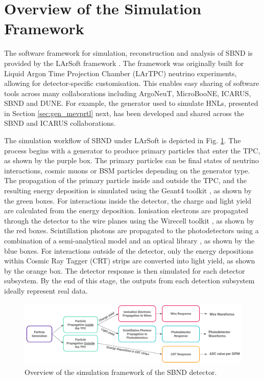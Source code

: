 \section{Overview of the Simulation Framework}
\label{sec:overview_sim}

The software framework for simulation, reconstruction and analysis of SBND is provided by the LArSoft framework \cite{larsoft}. 
The framework was originally built for Liquid Argon Time Projection Chamber (LArTPC) neutrino experiments, allowing for detector-specific customisation. 
This enables easy sharing of software tools across many collaborations including ArgoNeuT, MicroBooNE, ICARUS, SBND and DUNE. 
For example, the generator used to simulate HNLs, presented in Section \ref{sec:gen_mevprtl} next, has been developed and shared across the SBND and ICARUS collaborations.

The simulation workflow of SBND under LArSoft is depicted in Fig. \ref{fig:Sim_Workflow}.
The process begins with a generator to produce primary particles that enter the TPC, as shown by the purple box.
The primary particles can be final states of neutrino interactions, cosmic muons or BSM particles depending on the generator type.
The propagation of the primary particle inside and outside the TPC, and the resulting energy deposition is simulated using the Geant4 toolkit \cite{geant4}, as shown by the green boxes.
For interactions inside the detector, the charge and light yield are calculated from the energy deposition.
Ionisation electrons are propagated through the detector to the wire planes using the Wirecell toolkit \cite{wirecell}, as shown by the red boxes.
Scintillation photons are propagated to the photodetectors using a combination of a semi-analytical model and an optical library \cite{sbnd_pds_paper}, as shown by the blue boxes.
For interactions outside of the detector, only the energy depositions within Cosmic Ray Tagger (CRT) strips are converted into light yield, as shown by the orange box.
The detector response is then simulated for each detector subsystem.
By the end of this stage, the outputs from each detection subsystem ideally represent real data.

\begin{figure}[htbp!] 
\centering    
\includegraphics[width=1.0\textwidth]{Sim_Workflow}
\caption[Simulation Framework of SBND]{
Overview of the simulation framework of the SBND detector.
}
\label{fig:Sim_Workflow}
\end{figure}

